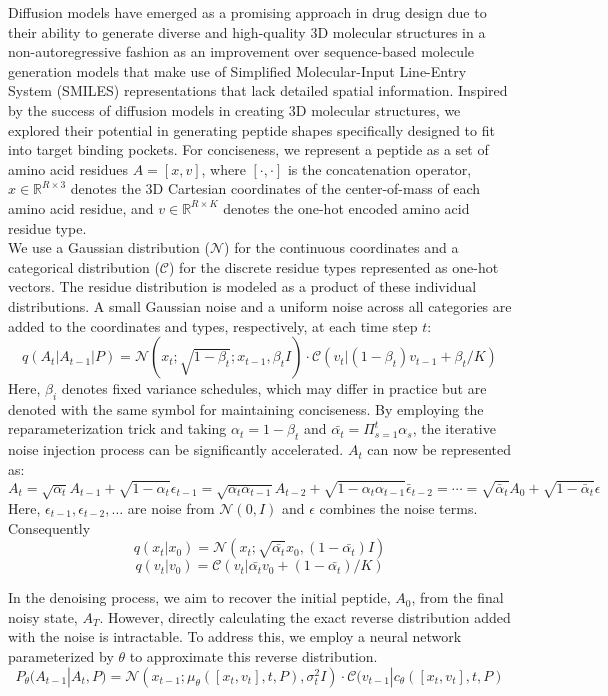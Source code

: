 Diffusion models have emerged as a promising approach in drug design due to their ability to generate diverse and high-quality 3D molecular structures in a non-autoregressive fashion \cite{du2022molgensurvey} as an improvement over sequence-based molecule generation models that make use of Simplified Molecular-Input Line-Entry System (SMILES) \cite{weininger1988smiles} representations that lack detailed spatial information. Inspired by the success of diffusion models in creating 3D molecular structures, we explored their potential in generating peptide shapes specifically designed to fit into target binding pockets. For conciseness, we represent a peptide as a set of amino acid residues $A = [x, v]$, where $[\cdot, \cdot]$ is the concatenation operator, $x \in \mathbb{R}^{R \times 3}$ denotes the 3D Cartesian coordinates of the center-of-mass of each amino acid residue, and $v \in \mathbb{R}^{R \times K}$ denotes the one-hot encoded amino acid residue type. \\

We use a Gaussian distribution ($\mathcal{N}$) for the continuous coordinates and a categorical distribution ($\mathcal{C}$) for the discrete residue types represented as one-hot vectors. The residue distribution is modeled as a product of these individual distributions. A small Gaussian noise and a uniform noise across all categories are added to the coordinates and types, respectively, at each time step $t$:
$$q(A_t|A_{t-1}|P)=\mathcal{N}(x_t;\sqrt{1-\beta_t};x_{t-1},\beta_t I) \cdot \mathcal{C}(v_t|(1-\beta_t)v_{t-1}+\beta_t/K)$$
Here, $\beta_i$ denotes fixed variance schedules, which may differ in practice but are denoted with the same symbol for maintaining conciseness. By employing the reparameterization trick and taking $\alpha_t = 1 - \beta_t$ and $\bar{\alpha_t} = \Pi_{s=1}^t \alpha_s$, the iterative noise injection process can be significantly accelerated. $A_t$ can now be represented as:
$$A_t =\sqrt{\alpha_t}A_{t-1} + \sqrt{1-\alpha_t}\epsilon_{t-1}
= \sqrt{{\alpha_t}\alpha_{t-1}}A_{t-2} + \sqrt{1-\alpha_t\alpha_{t-1}}\bar{\epsilon}_{t-2} = \cdots = \sqrt{\bar{\alpha}_t}A_0 + \sqrt{1-\bar{\alpha}_t}\epsilon$$
Here, $\epsilon_{t-1}, \epsilon_{t-2}, \ldots$ are noise from $\mathcal{N}(0, I)$ and $\epsilon$ combines the noise terms. Consequently
$$q(x_t|x_0)=\mathcal{N}(x_t;\sqrt{\bar{\alpha_t}}x_0, (1-\bar{\alpha_t})I)$$
$$q(v_t|v_0)=\mathcal{C}(v_t|\bar{\alpha_t}v_0 + (1-\bar{\alpha_t})/K)$$

In the denoising process, we aim to recover the initial peptide, $A_0$, from the final noisy state, $A_T$. However, directly calculating the exact reverse distribution added with the noise is intractable. To address this, we employ a neural network parameterized by $\theta$ to approximate this reverse distribution. \\
$$P_{\theta}(A_{t-1}|A_t, P)=\mathcal{N}(x_{t-1};\mu_{\theta}([x_t, v_t], t, P), \sigma_t^2I) \cdot \mathcal{C}(v_{t-1}|c_\theta([x_t, v_t], t, P)$$

